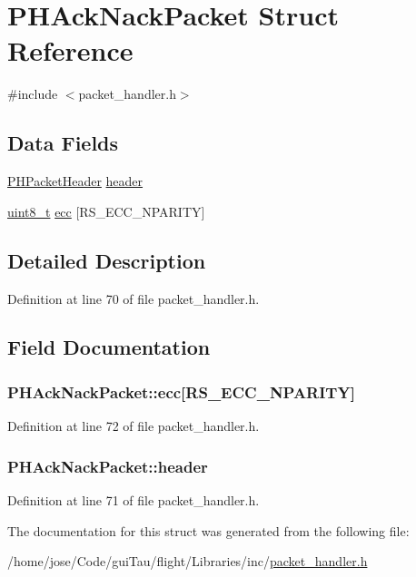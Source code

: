 \hypertarget{struct_p_h_ack_nack_packet}{\section{P\-H\-Ack\-Nack\-Packet Struct Reference}
\label{struct_p_h_ack_nack_packet}
}


{\ttfamily \#include $<$packet\-\_\-handler.\-h$>$}

\subsection*{Data Fields}
\begin{DoxyCompactItemize}
\item 
\hyperlink{struct_p_h_packet_header}{P\-H\-Packet\-Header} \hyperlink{struct_p_h_ack_nack_packet_aac07270becd441ff9dafa3e01945883c}{header}
\item 
\hyperlink{stdint_8h_aba7bc1797add20fe3efdf37ced1182c5}{uint8\-\_\-t} \hyperlink{struct_p_h_ack_nack_packet_a362bb5e45f310d81a10a2bdfa8108ce8}{ecc} \mbox{[}R\-S\-\_\-\-E\-C\-C\-\_\-\-N\-P\-A\-R\-I\-T\-Y\mbox{]}
\end{DoxyCompactItemize}


\subsection{Detailed Description}


Definition at line 70 of file packet\-\_\-handler.\-h.



\subsection{Field Documentation}
\hypertarget{struct_p_h_ack_nack_packet_a362bb5e45f310d81a10a2bdfa8108ce8}{
\subsubsection[{ecc}]{ P\-H\-Ack\-Nack\-Packet\-::ecc\mbox{[}R\-S\-\_\-\-E\-C\-C\-\_\-\-N\-P\-A\-R\-I\-T\-Y\mbox{]}}}\label{struct_p_h_ack_nack_packet_a362bb5e45f310d81a10a2bdfa8108ce8}


Definition at line 72 of file packet\-\_\-handler.\-h.

\hypertarget{struct_p_h_ack_nack_packet_aac07270becd441ff9dafa3e01945883c}{
\subsubsection[{header}]{ P\-H\-Ack\-Nack\-Packet\-::header}}\label{struct_p_h_ack_nack_packet_aac07270becd441ff9dafa3e01945883c}


Definition at line 71 of file packet\-\_\-handler.\-h.



The documentation for this struct was generated from the following file\-:\begin{DoxyCompactItemize}
\item 
/home/jose/\-Code/gui\-Tau/flight/\-Libraries/inc/\hyperlink{packet__handler_8h}{packet\-\_\-handler.\-h}\end{DoxyCompactItemize}
